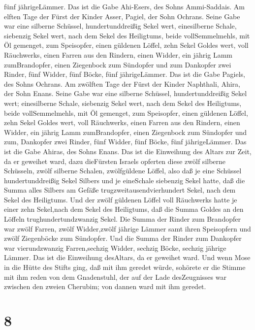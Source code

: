 fünf jährigeLämmer. Das ist die Gabe Ahi-Esers, des Sohns Ammi-Saddais.
 Am elften Tage der Fürst der Kinder Asser, Pagiel, der
Sohn Ochrans.  Seine Gabe war eine silberne Schüssel,
hundertunddreißig Sekel wert, einesilberne Schale, siebenzig Sekel wert,
nach dem Sekel des Heiligtums, beide vollSemmelmehls, mit Öl gemenget,
zum Speisopfer,  einen güldenen Löffel, zehn Sekel Goldes
wert, voll Räuchwerks,  einen Farren aus den Rindern, einen
Widder, ein jährig Lamm zumBrandopfer,  einen Ziegenbock
zum Sündopfer  und zum Dankopfer zwei Rinder, fünf Widder,
fünf Böcke, fünf jährigeLämmer. Das ist die Gabe Pagiels, des Sohns
Ochrans.  Am zwölften Tage der Fürst der Kinder Naphthali,
Ahira, der Sohn Enans.  Seine Gabe war eine silberne
Schüssel, hundertunddreißig Sekel wert; einesilberne Schale, siebenzig
Sekel wert, nach dem Sekel des Heiligtums, beide vollSemmelmehls, mit Öl
gemenget, zum Speisopfer,  einen güldenen Löffel, zehn
Sekel Goldes wert, voll Räuchwerks,  einen Farren aus den
Rindern, einen Widder, ein jährig Lamm zumBrandopfer, 
einen Ziegenbock zum Sündopfer  und zum, Dankopfer zwei
Rinder, fünf Widder, fünf Böcke, fünf jährigeLämmer. Das ist die Gabe
Ahiras, des Sohns Enans.  Das ist die Einweihung des Altars
zur Zeit, da er geweihet ward, dazu dieFürsten Israels opferten diese
zwölf silberne Schüsseln, zwölf silberne Schalen, zwölfgüldene Löffel,
 also daß je eine Schüssel hundertunddreißig Sekel Silbers
und je eineSchale siebenzig Sekel hatte, daß die Summa alles Silbers am
Gefäße trugzweitausendvierhundert Sekel, nach dem Sekel des Heiligtums.
 Und der zwölf güldenen Löffel voll Räuchwerks hatte je
einer zehn Sekel,nach dem Sekel des Heiligtums, daß die Summa Goldes an
den Löffeln trughundertundzwanzig Sekel.  Die Summa der
Rinder zum Brandopfer war zwölf Farren, zwölf Widder,zwölf jährige
Lämmer samt ihren Speisopfern und zwölf Ziegenböcke zum Sündopfer.
 Und die Summa der Rinder zum Dankopfer war vierundzwanzig
Farren,sechzig Widder, sechzig Böcke, sechzig jährige Lämmer. Das ist
die Einweihung desAltars, da er geweihet ward.  Und wenn
Mose in die Hütte des Stifts ging, daß mit ihm geredet würde, sohörete
er die Stimme mit ihm reden von dem Gnadenstuhl, der auf der Lade
desZeugnisses war zwischen den zweien Cherubim; von dannen ward mit ihm
geredet.

\hypertarget{section-7}{%
\section{8}\label{section-7}}

